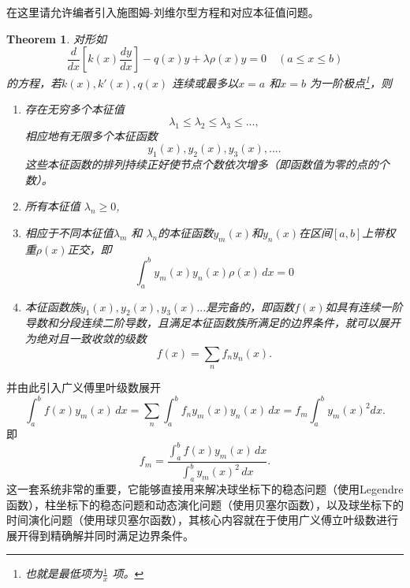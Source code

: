 \documentclass[12pt,a4paper,openany,twoside]{book}
\newtheorem{theorem}{Theorem}[section]
\numberwithin{equation}{section}
\begin{document}
    在这里请允许编者引入施图姆-刘维尔型方程和对应本征值问题。
    \begin{theorem}
    	对形如
	\begin{equation}
		\frac{d }{d x} \left[ k(x) \frac{d y}{d x}  \right] -q(x)y + \lambda \rho(x) y = 0 \quad (a\leqslant x \leqslant b)
	\end{equation}
	的方程，若$k(x),k'(x),q(x)$ 连续或最多以$x=a$ 和$x=b$ 为一阶极点\footnote{也就是最低项为$\frac{1}{x}$ 项。}，则
	\begin{enumerate}
		\item 存在无穷多个本征值
		\[
		\lambda_1 \leqslant \lambda_2 \leqslant \lambda_3 \leqslant ...
		,\] 
		相应地有无限多个本征函数
		\[
			y_1(x),y_2(x),y_3(x),...
		.\] 
		这些本征函数的排列持续正好使节点个数依次增多（即函数值为零的点的个数）。
		\item 所有本征值 $\lambda_n \geqslant 0$,
		\item 相应于不同本征值$\lambda_m$ 和 $\lambda_n$的本征函数$y_m(x)$和$y_n(x)$在区间$[a,b]$上带权重$\rho(x)$正交，即
			\begin{equation}
				\int ^b_a y_m(x) y_n(x) \rho(x) \, dx = 0 
			\end{equation}
		\item 本征函数族$y_1(x),y_2(x),y_3(x)...$是完备的，即函数$f(x)$如具有连续一阶导数和分段连续二阶导数，且满足本征函数族所满足的边界条件，就可以展开为绝对且一致收敛的级数
			\[
				f(x) = \sum_n f_n y_n(x)
			.\] 
	\end{enumerate}
    \end{theorem}
    并由此引入广义傅里叶级数展开
    \[
	    \int ^b_a f(x) y_m(x) \, dx = \sum_n \int^b_a f_n y_m(x)y_n(x) \, dx = f_m \int^b_a y_m(x)^2 dx   
    .\] 
    即
    \[
	    f_m = \frac{\int ^b_a f(x) y_m(x) \, dx }{\int^b_a y_m(x)^2 \, dx }
    .\] 
    这一套系统非常的重要，它能够直接用来解决球坐标下的稳态问题（使用Legendre函数），柱坐标下的稳态问题和动态演化问题（使用贝塞尔函数），以及球坐标下的时间演化问题（使用球贝塞尔函数），其核心内容就在于使用广义傅立叶级数进行展开得到精确解并同时满足边界条件。
\end{document}
